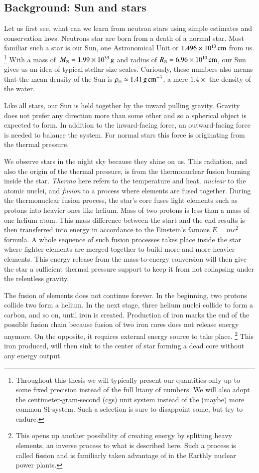 \subsection{Background: Sun and stars}
Let us first see, what can we learn from neutron stars using simple estimates and conservation laws.
Neutrons star are born from a death of a normal star.%
Most familiar such a star is our Sun, one Astronomical Unit or $1.496 \times 10^{13} \, \mathrm{cm}$ from us.%
\footnote{Throughout this thesis we will typically present our quantities only up to some fixed precision instead of the full litany of numbers.
We will also adopt the centimeter-gram-second (cgs) unit system instead of the (maybe) more common SI-system. 
Such a selection is sure to disappoint some, but try to endure.
}
With a mass of $\, M_{\odot} = 1.99 \times 10^{33} \, \mathrm{g}$ and radius of $R_{\odot} = 6.96 \times 10^{10} \, \mathrm{cm}$, our Sun gives us an idea of typical stellar size scales.
Curiously, these numbers also means that the mean density of the Sun is $\rho_{\odot} \approx 1.41 \, \mathrm{g}\,\mathrm{cm}^{-3}$, a mere $1.4\times$ the density of the water.

Like all stars, our Sun is held together by the inward pulling gravity.
Gravity does not prefer any direction more than some other and so a spherical object is expected to form.
In addition to the inward-facing force, an outward-facing force is needed to balance the system.
For normal stars this force is originating from the thermal pressure.

We observe stars in the night sky because they shine on us.
This radiation, and also the origin of the thermal pressure, is from the thermonuclear fusion burning inside the star.
\textit{Thermo} here refers to the temperature and heat, \textit{nuclear} to the atomic nuclei, and \textit{fusion} to a process where elements are fused together.
During the thermonuclear fusion process, the star's core fuses light elements such as protons into heavier ones like helium.
Mass of two protons is less than a mass of one helium atom.
This mass difference between the start and the end results is then transferred into energy in accordance to the Einstein's famous $E = mc^2$ formula.
A whole sequence of such fusion processes takes place inside the star where lighter elements are merged together to build more and more heavier elements.
This energy release from the mass-to-energy conversion will then give the star a sufficient thermal pressure support to keep it from not collapsing under the relentless gravity.

The fusion of elements does not continue forever.
In the beginning, two protons collide two form a helium.
In the next stage, three helium nuclei collide to form a carbon, and so on, until iron is created.
Production of iron marks the end of the possible fusion chain because fusion of two iron cores does not release energy anymore. 
On the opposite, it requires external energy source to take place.%
\footnote{This opens up another possibility of creating energy by splitting heavy elements, an inverse process to what is described here. Such a process is called fission and is familiarly taken advantage of in the Earthly nuclear power plants.}
This iron produced, will then sink to the center of star forming a dead core without any energy output.

